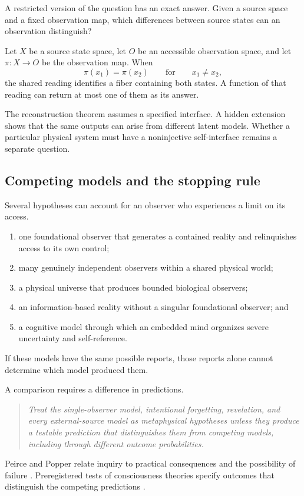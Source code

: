 A restricted version of the question has an exact answer. Given a source space and a fixed observation map, which differences between source states can an observation distinguish?

Let \(X\) be a source state space, let \(O\) be an accessible observation space, and let \(\pi:X\to O\) be the observation map. When
\[
\pi(x_1)=\pi(x_2)
\qquad\text{for}\qquad
x_1\neq x_2,
\]
the shared reading identifies a fiber containing both states. A function of that reading can return at most one of them as its answer.

The reconstruction theorem assumes a specified interface. A hidden extension shows that the same outputs can arise from different latent models. Whether a particular physical system must have a noninjective self-interface remains a separate question.

\subsection{Competing models and the stopping rule}

Several hypotheses can account for an observer who experiences a limit on its access.
\begin{enumerate}[label=(\alph*)]
\item one foundational observer that generates a contained reality and relinquishes access to its own control;
\item many genuinely independent observers within a shared physical world;
\item a physical universe that produces bounded biological observers;
\item an information-based reality without a singular foundational observer; and
\item a cognitive model through which an embedded mind organizes severe uncertainty and self-reference.
\end{enumerate}
If these models have the same possible reports, those reports alone cannot determine which model produced them.

A comparison requires a difference in predictions.
\begin{quote}
\emph{Treat the single-observer model, intentional forgetting, revelation, and every external-source model as metaphysical hypotheses unless they produce a testable prediction that distinguishes them from competing models, including through different outcome probabilities.}
\end{quote}
Peirce and Popper relate inquiry to practical consequences and the possibility of failure \parencite{Peirce1877,Popper1959}. Preregistered tests of consciousness theories specify outcomes that distinguish the competing predictions \parencite{Cogitate2025,Robinson2025}.

